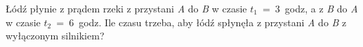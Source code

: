 Łódź płynie z prądem rzeki z przystani \emph{A} do \emph{B} w czasie \emph{$t_1$}~=~3~godz, a z \emph{B} do \emph{A} w czasie \emph{$t_2$}~=~6~godz. Ile czasu trzeba, aby łódź spłynęła z przystani \emph{A} do \emph{B} z wyłączonym silnikiem?

